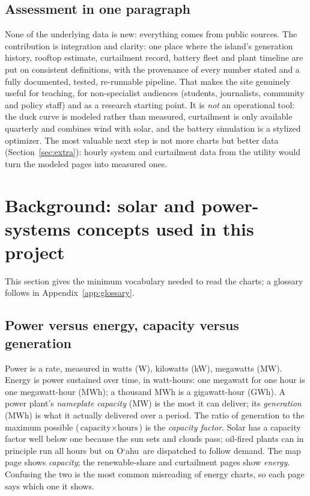 \documentclass[11pt,a4paper]{article}
\newcommand{\okina}{\textquoteleft}
\newcommand{\Oahu}{\texorpdfstring{O\okina ahu}{Oahu}}
\begin{document}
\subsection*{Assessment in one paragraph}
None of the underlying data is new: everything comes from public sources. The contribution is integration and
clarity: one place where the island's generation history, rooftop estimate, curtailment record, battery
fleet and plant timeline are put on consistent definitions, with the provenance of every number stated and a
fully documented, tested, re-runnable pipeline. That makes the site genuinely useful for teaching, for
non-specialist audiences (students, journalists, community and policy staff) and as a research starting point. It
is \emph{not} an operational tool: the duck curve is modeled rather than measured, curtailment is only
available quarterly and combines wind with solar, and the battery simulation is a stylized optimizer. The most
valuable next step is not more charts but better data (Section~\ref{sec:extra}): hourly system and
curtailment data from the utility would turn the modeled pages into measured ones.

\section{Background: solar and power-systems concepts used in this project}
\label{sec:background}

This section gives the minimum vocabulary needed to read the charts; a glossary follows in
Appendix~\ref{app:glossary}.

\subsection{Power versus energy, capacity versus generation}
Power is a rate, measured in watts (W), kilowatts (kW), megawatts (MW). Energy is power sustained over time, in
watt-hours: one megawatt for one hour is one megawatt-hour (MWh); a thousand MWh is a gigawatt-hour (GWh). A power
plant's \emph{nameplate capacity} (MW) is the most it can deliver; its \emph{generation} (MWh) is what it actually
delivered over a period. The ratio of generation to the maximum possible ($\text{capacity}\times\text{hours}$) is
the \emph{capacity factor}. Solar has a capacity factor well below one because the sun sets and clouds pass;
oil-fired plants can in principle run all hours but on \Oahu\ are dispatched to follow demand. The map page shows
\emph{capacity}; the renewable-share and curtailment pages show \emph{energy}. Confusing the two is the most
common misreading of energy charts, so each page says which one it shows.
\end{document}
